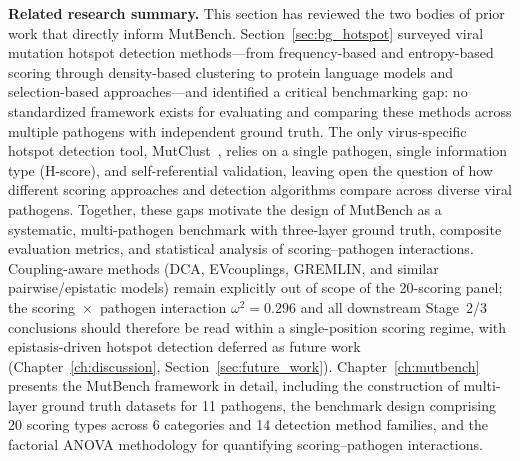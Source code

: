 \vspace{1em}
\noindent\textbf{Related research summary.}
This section has reviewed the two bodies of prior work that directly inform MutBench.
Section~\ref{sec:bg_hotspot} surveyed viral mutation hotspot detection methods---from frequency-based and entropy-based scoring through density-based clustering to protein language models and selection-based approaches---and identified a critical benchmarking gap: no standardized framework exists for evaluating and comparing these methods across multiple pathogens with independent ground truth.
The only virus-specific hotspot detection tool, MutClust~\cite{youn2025mutclust}, relies on a single pathogen, single information type (H-score), and self-referential validation, leaving open the question of how different scoring approaches and detection algorithms compare across diverse viral pathogens.
Together, these gaps motivate the design of MutBench as a systematic, multi-pathogen benchmark with three-layer ground truth, composite evaluation metrics, and statistical analysis of scoring--pathogen interactions.
Coupling-aware methods (DCA, EVcouplings, GREMLIN, and similar pairwise/epistatic models) remain explicitly out of scope of the 20-scoring panel; the scoring~$\times$~pathogen interaction $\omega^2 = 0.296$ and all downstream Stage~2/3 conclusions should therefore be read within a single-position scoring regime, with epistasis-driven hotspot detection deferred as future work (Chapter~\ref{ch:discussion}, Section~\ref{sec:future_work}).
Chapter~\ref{ch:mutbench} presents the MutBench framework in detail, including the construction of multi-layer ground truth datasets for 11 pathogens, the benchmark design comprising 20 scoring types across 6 categories and 14 detection method families, and the factorial ANOVA methodology for quantifying scoring--pathogen interactions.
